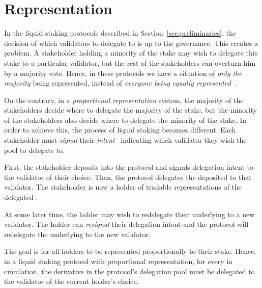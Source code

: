 \section{Representation}

In the liquid staking protocols described in Section~\ref{sec:preliminaries},
the decision of which validators to delegate to is up to the governance.
This creates a problem. A stakeholder holding a minority of the stake
may wish to delegate this stake to a particular validator, but the rest
of the stakeholders can overturn him by a majority vote. Hence, in these
protocols we have a situation of \emph{only the majority} being represented,
instead of \emph{everyone being equally represented}~\cite{mill1862true}.

On the contrary, in a \emph{proportional representation} system, the
majority of the stakeholders decide where to delegate the majority of
the stake, but the minority of the stakeholders also decide where to delegate
the minority of the stake. In order to achieve this, the process of liquid
staking becomes different. Each stakeholder must \emph{signal} their
\emph{intent}~\cite{quicksilver} indicating which validator they wish
the pool to delegate to.

First, the stakeholder deposits \asset into the protocol and signals
delegation intent to the validator of their choice. Then, the protocol
delegates the deposited \asset to that validator. The stakeholder is
now a holder of tradable \stasset representations of the delegated \asset.

At some later time, the \stasset holder may wish to redelegate
their underlying \asset to a new validator.
The \stasset holder can \emph{resignal} their delegation intent and the protocol
will redelegate the underlying \asset to the new validator.

The goal is for all \stasset holders to be represented proportionally to
their stake. Hence, in a liquid staking protocol with proportional
representation, for every \stasset in circulation, the derivative \asset
in the protocol's delegation pool must be delegated to the validator
of the current \stasset holder's choice.


